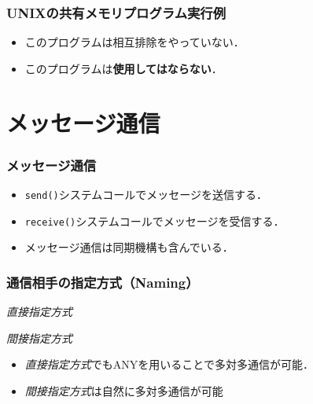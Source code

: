 \documentclass[unicode,handout]{beamer}                   %
\begin{document}
\begin{frame}
  \frametitle{UNIXの共有メモリプログラム実行例}
  \begin{itemize}
  \item このプログラムは相互排除をやっていない．
  \item このプログラムは{\bf 使用してはならない}．
  \end{itemize}
\end{frame}

\section{メッセージ通信}
\begin{frame}
  \frametitle{メッセージ通信}
  \begin{itemize}
  \item {\tt send()}システムコールでメッセージを送信する．
  \item {\tt receive()}システムコールでメッセージを受信する．
  \item メッセージ通信は同期機構も含んでいる．
  \end{itemize}
\end{frame}

\begin{frame}
  \frametitle{通信相手の指定方式（Naming）}
  \begin{center}
    \emph{直接指定方式}
  \end{center}
  \begin{center}
    \emph{間接指定方式}
  \end{center}
  \begin{itemize}
  \item \emph{直接指定方式}でもANYを用いることで多対多通信が可能．
  \item \emph{間接指定方式}は自然に多対多通信が可能
  \end{itemize}
\end{frame}
\end{document}
